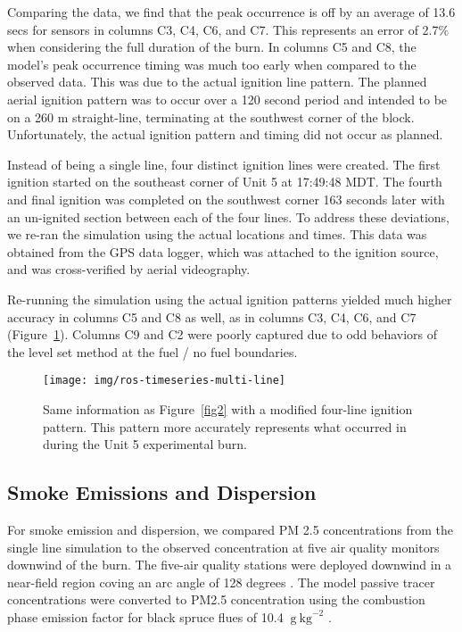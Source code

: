 \documentclass[preprints,article,accept,moreauthors,pdftex]{Definitions/mdpi}
\begin{document}
Comparing the data, we find that the peak occurrence is off by an average of 13.6 secs for sensors in columns C3, C4, C6, and C7. This represents an error of 2.7$\%$ when considering the full duration of the burn. In columns C5 and C8, the model’s peak occurrence timing was much too early when compared to the observed data. This was due to the actual ignition line pattern. The planned aerial ignition pattern was to occur over a 120 second period and intended to be on a 260 m straight-line, terminating at the southwest corner of the block. Unfortunately, the actual ignition pattern and timing did not occur as planned.

Instead of being a single line, four distinct ignition lines were created. The first ignition started on the southeast corner of Unit 5 at 17:49:48 MDT. The fourth and final ignition was completed on the southwest corner 163 seconds later with an un-ignited section between each of the four lines. To address these deviations, we re-ran the simulation using the actual locations and times. This data was obtained from the GPS data logger, which was attached to the ignition source, and was cross-verified by aerial videography.

Re-running the simulation using the actual ignition patterns yielded much higher accuracy in columns C5 and C8 as well, as in columns C3, C4, C6, and C7 (Figure~\ref{fig3}). Columns C9 and C2 were poorly captured due to odd behaviors of the level set method at the fuel / no fuel boundaries.

\begin{figure}[H]
\centering
 \texttt{[image: img/ros-timeseries-multi-line]}
 \caption{Same information as Figure~\ref{fig2} with a modified four-line ignition pattern. This pattern more accurately represents what occurred in during the Unit 5 experimental burn.\label{fig3}}
 \end{figure}

\subsection{Smoke Emissions and Dispersion}

For smoke emission and dispersion, we compared PM 2.5 concentrations from the single line simulation to the observed concentration at five air quality monitors downwind of the burn. The five-air quality stations were deployed downwind in a near-field region coving an arc angle of 128 degrees \cite{huda_study_2020}. The model passive tracer concentrations were converted to PM2.5 concentration using the combustion phase emission factor for black spruce flues of 10.4 $\mathrm{~g}\mathrm{~kg}^{-2}$ \cite{prichard_wildland_2020}.
\end{document}
